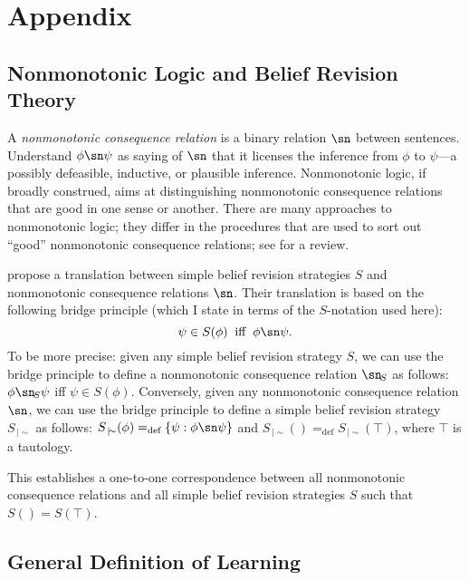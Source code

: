 \section{Appendix}

\subsection{Nonmonotonic Logic and Belief Revision Theory}\label{app-trans}

A {\em nonmonotonic consequence relation} is a binary relation $\sn$ between sentences. Understand $\phi \sn \psi$ as saying of $\sn$ that it licenses the inference from $\phi$ to $\psi$---a possibly defeasible, inductive, or plausible inference. Nonmonotonic logic, if broadly construed, aims at distinguishing nonmonotonic consequence relations that are good in one sense or another. There are many approaches to nonmonotonic logic; they differ in the procedures that are used to sort out ``good'' nonmonotonic consequence relations; see \citet*{brewka2008nonmonotonic} for a review.

\citet*{makinson1991relations} propose a translation between simple belief revision strategies $S$ and nonmonotonic consequence relations $\sn$. Their translation is based on the following bridge principle (which I state in terms of the $S$-notation used here): 
	$$\psi \in S(\phi) \;\;\text{iff}\;\; \phi \sn \psi.$$ 
To be more precise: given any simple belief revision strategy $S$, we can use the bridge principle to define a nonmonotonic consequence relation $\sn_{\!S}$ as follows: $\phi \sn_{\!S} \psi$ iff $\psi \in S(\phi)$. Conversely, given any nonmonotonic consequence relation $\sn$, we can use the bridge principle to define a simple belief revision strategy $S_{\,|\!\sim}$ as follows: $S_{\,|\!\sim}(\phi) =_\text{def} \{\psi: \phi \sn \psi\}$ and $S_{\,|\!\sim}() =_\text{def} S_{\,|\!\sim}(\top)$, where $\top$ is a tautology. 

This establishes a one-to-one correspondence between all nonmonotonic consequence relations and all simple belief revision strategies $S$ such that $S() = S(\top)$.

\subsection{General Definition of Learning}\label{app-learning}

